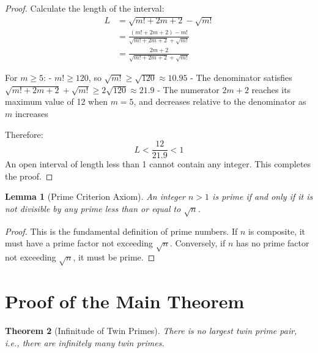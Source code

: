 \documentclass[12pt,letterpaper,reqno]{amsart}
\theoremstyle{plain}
\newtheorem{theorem}{Theorem}[section]
\newtheorem{lemma}[theorem]{Lemma}
\theoremstyle{definition}
\theoremstyle{remark}
\begin{document}
	\begin{proof}
		Calculate the length of the interval:
		\begin{align*}
			L &= \sqrt{m!+2m+2} - \sqrt{m!} \\
			&= \frac{(m!+2m+2) - m!}{\sqrt{m!+2m+2} + \sqrt{m!}} \\
			&= \frac{2m+2}{\sqrt{m!+2m+2} + \sqrt{m!}}
		\end{align*}
		
		For $m \ge 5$:
		- $m! \ge 120$, so $\sqrt{m!} \ge \sqrt{120} \approx 10.95$
		- The denominator satisfies $\sqrt{m!+2m+2} + \sqrt{m!} \ge 2\sqrt{120} \approx 21.9$
		- The numerator $2m+2$ reaches its maximum value of 12 when $m=5$, and decreases relative to the denominator as $m$ increases
		
		Therefore:
		\[
		L < \frac{12}{21.9} < 1
		\]
		An open interval of length less than 1 cannot contain any integer. This completes the proof.
	\end{proof}
	
	\begin{lemma}[Prime Criterion Axiom]
		An integer $n > 1$ is prime if and only if it is not divisible by any prime less than or equal to $\sqrt{n}$.
	\end{lemma}
	
	\begin{proof}
		This is the fundamental definition of prime numbers. If $n$ is composite, it must have a prime factor not exceeding $\sqrt{n}$. Conversely, if $n$ has no prime factor not exceeding $\sqrt{n}$, it must be prime.
	\end{proof}
	
	\section{Proof of the Main Theorem}
	
	\begin{theorem}[Infinitude of Twin Primes]
		There is no largest twin prime pair, i.e., there are infinitely many twin primes.
	\end{theorem}
	
\end{document}
